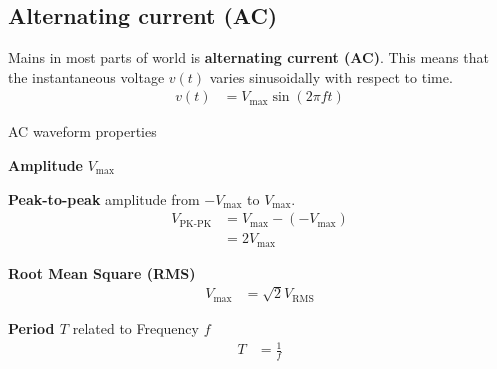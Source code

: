 \documentclass{pgslides}
\begin{document}
\subsection{Alternating current (AC)}

\begin{frame}{\insertsubsectionhead}
  Mains in most parts of world is \textbf{alternating current (AC)}.
This means that the instantaneous voltage $v(t)$ varies sinusoidally with respect to time.
\begin{align}
  v(t) & = V_{\mbox{max}} \sin ( 2 \pi f t ) \label{eq:ac-instantaneous-voltage}
\end{align}
\end{frame}


\begin{frame}{AC waveform properties}

  \textbf{Amplitude} $V_{\mbox{max}}$
  
  \textbf{Peak-to-peak} amplitude from $-V_{\mbox{max}}$ to $V_{\mbox{max}}$.
  \begin{align}
    V_{\mbox{PK-PK}} & = V_{\mbox{max}} - ( - V_{\mbox{max}} ) \\
                     & = 2 V_{\mbox{max}}                    
  \end{align}

  \textbf{Root Mean Square (RMS)}
  \begin{align}
    V_{\mbox{max}} & = \sqrt{2} V_{\mbox{RMS}}
  \end{align}

  \textbf{Period $T$} related to Frequency $f$
  \begin{align}
    T & = \frac{1}{f} 
  \end{align}
  
\end{frame}

\end{document}
